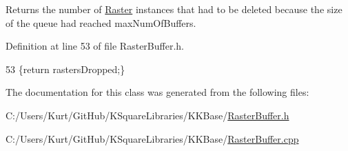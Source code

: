Returns the number of \textquotesingle{}\hyperlink{class_k_k_b_1_1_raster}{Raster}\textquotesingle{} instances that had to be deleted because the size of the queue had reached \textquotesingle{}max\+Num\+Of\+Buffers\textquotesingle{}. 



Definition at line 53 of file Raster\+Buffer.\+h.


\begin{DoxyCode}
53 \{\textcolor{keywordflow}{return} rastersDropped;\}
\end{DoxyCode}


The documentation for this class was generated from the following files\+:\begin{DoxyCompactItemize}
\item 
C\+:/\+Users/\+Kurt/\+Git\+Hub/\+K\+Square\+Libraries/\+K\+K\+Base/\hyperlink{_raster_buffer_8h}{Raster\+Buffer.\+h}\item 
C\+:/\+Users/\+Kurt/\+Git\+Hub/\+K\+Square\+Libraries/\+K\+K\+Base/\hyperlink{_raster_buffer_8cpp}{Raster\+Buffer.\+cpp}\end{DoxyCompactItemize}
